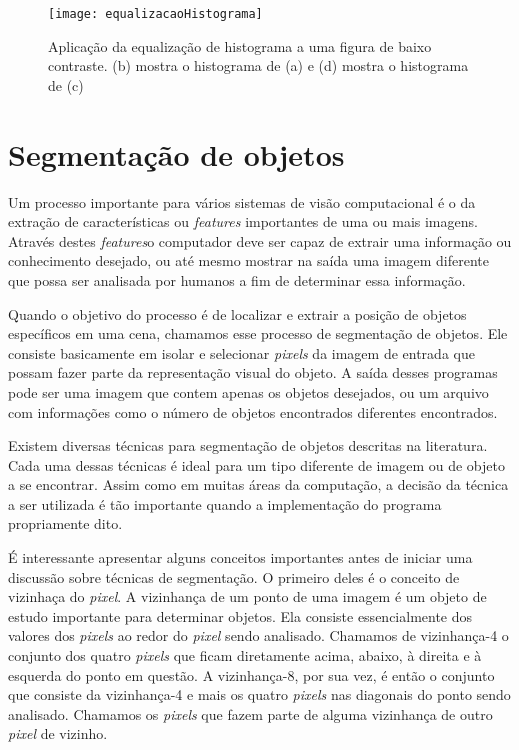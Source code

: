         \begin{figure}
      \texttt{[image: equalizacaoHistograma]}
      \caption{Aplicação da equalização de histograma a uma figura de baixo contraste. (b) mostra o histograma de (a) e (d) mostra o histograma de (c) \cite{marques1999processamento}}\label{equalizacaoHistogramasFig}
    \end{figure}










    \section{Segmentação de objetos} \label{segmentacao}
        Um processo importante para vários sistemas de visão computacional é o da extração de características ou \textit{features} importantes de uma ou mais imagens. Através destes \textit{features}o computador deve ser capaz de extrair uma informação ou conhecimento desejado, ou até mesmo mostrar na saída uma imagem diferente que possa ser analisada por humanos a fim de determinar essa informação.

        Quando o objetivo do processo é de localizar e extrair a posição de objetos específicos em uma cena, chamamos esse processo de segmentação de objetos. Ele consiste basicamente em isolar e selecionar \textit{pixels} da imagem de entrada que possam fazer parte da representação visual do objeto\cite{graciano2007rastreamento}. A saída desses programas pode ser uma imagem que contem apenas os objetos desejados, ou um arquivo com informações como o número de objetos encontrados diferentes encontrados.

        Existem diversas técnicas para segmentação de objetos descritas na literatura. Cada uma dessas técnicas é ideal para um tipo diferente de imagem ou de objeto a se encontrar. Assim como em muitas áreas da computação, a decisão da técnica a ser utilizada é tão importante quando a implementação do programa propriamente dito.

        É interessante apresentar alguns conceitos importantes antes de iniciar uma discussão sobre técnicas de segmentação. O primeiro deles é o conceito de vizinhaça do \textit{pixel}. A vizinhança de um ponto de uma imagem é um objeto de estudo importante para determinar objetos. Ela consiste essencialmente dos valores dos \textit{pixels} ao redor do \textit{pixel} sendo analisado. Chamamos de vizinhança-4 o conjunto dos quatro \textit{pixels} que ficam diretamente acima, abaixo, à direita e à esquerda do ponto em questão. A vizinhança-8, por sua vez, é então o conjunto que consiste da vizinhança-4 e mais os quatro \textit{pixels} nas diagonais do ponto sendo analisado. Chamamos os \textit{pixels} que fazem parte de alguma vizinhança de outro \textit{pixel} de vizinho.

